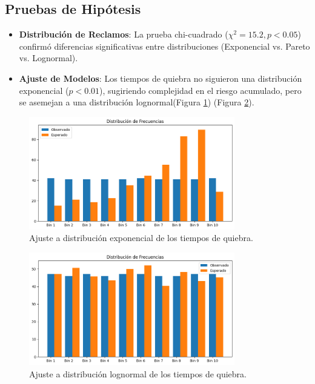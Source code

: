 \documentclass{article}
\begin{document}
\subsection{Pruebas de Hipótesis}
\begin{itemize}
    \item \textbf{Distribución de Reclamos}: La prueba chi-cuadrado (\( \chi^2 = 15.2, p < 0.05 \)) confirmó diferencias significativas entre distribuciones (Exponencial vs. Pareto vs. Lognormal).
    \item \textbf{Ajuste de Modelos}: Los tiempos de quiebra no siguieron una distribución exponencial (\( p < 0.01 \)), sugiriendo complejidad en el riesgo acumulado, pero se asemejan a una distribución lognormal(Figura \ref{fig:exponencial}) (Figura \ref{fig:lognormal}).
\end{itemize}

\begin{figure}[ht]
    \centering
    \includegraphics[width=0.8\textwidth]{Expon_Test.png}
    \caption{Ajuste a distribución exponencial de los tiempos de quiebra.}
    \label{fig:exponencial}
\end{figure}

\begin{figure}[ht]
    \centering
    \includegraphics[width=0.8\textwidth]{LogNormal_Test.png}
    \caption{Ajuste a distribución lognormal de los tiempos de quiebra.}
    \label{fig:lognormal}
\end{figure}
\end{document}
